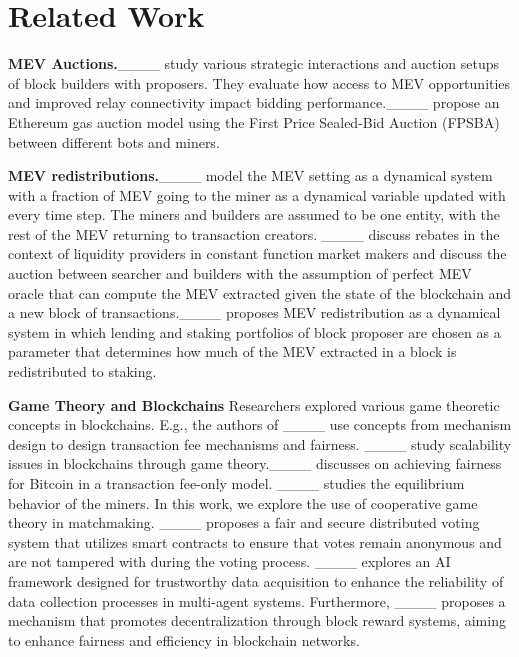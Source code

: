 \section{Related Work}
\label{sec:related}

\textbf{MEV Auctions.}____ study various strategic interactions and auction setups of block builders with proposers. They evaluate how access to MEV opportunities and improved relay connectivity impact bidding performance.____ propose an Ethereum gas auction model using the First Price Sealed-Bid Auction (FPSBA) between different bots and miners.

\noindent\textbf{MEV redistributions.}____ model the MEV setting as a dynamical system with a fraction of MEV going to the miner as a dynamical variable updated with every time step. The miners and builders are assumed to be one entity, with the rest of the MEV returning to transaction creators. ____ discuss rebates in the context of liquidity providers in constant function market makers and discuss the auction between searcher and builders with the assumption of perfect MEV oracle that can compute the MEV extracted given the state of the blockchain and a new block of transactions.____ proposes MEV redistribution as a dynamical system in which lending and staking portfolios of block proposer are chosen as a parameter that determines how much of the MEV extracted in a block is redistributed to staking.

\noindent\textbf{Game Theory and Blockchains} Researchers explored various game theoretic concepts in blockchains. E.g., the authors of ____  use concepts from mechanism design to design transaction fee mechanisms and fairness. ____ study scalability issues in blockchains through game theory.____ discusses on achieving fairness for Bitcoin in a transaction fee-only model. ____ studies the equilibrium behavior of the miners. In this work, we explore the use of cooperative game theory in matchmaking. ____ proposes a fair and secure distributed voting system that utilizes smart contracts to ensure that votes remain anonymous and are not tampered with during the voting process. ____ explores an AI framework designed for trustworthy data acquisition to enhance the reliability of data collection processes in multi-agent systems. Furthermore, ____ proposes a mechanism that promotes decentralization through block reward systems, aiming to enhance fairness and efficiency in blockchain networks.

